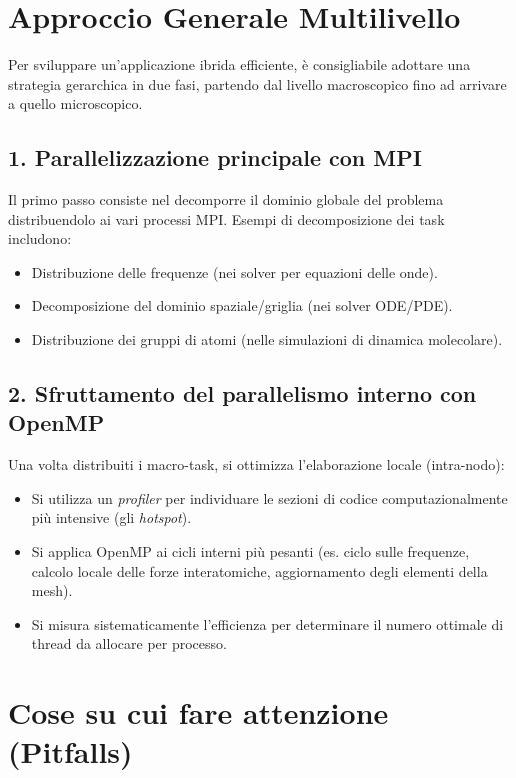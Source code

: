 \section*{Approccio Generale Multilivello}

Per sviluppare un'applicazione ibrida efficiente, è consigliabile adottare una strategia gerarchica in due fasi, partendo dal livello macroscopico fino ad arrivare a quello microscopico.

\subsection*{1. Parallelizzazione principale con MPI}
Il primo passo consiste nel decomporre il dominio globale del problema distribuendolo ai vari processi MPI. Esempi di decomposizione dei task includono:
\begin{itemize}
    \item Distribuzione delle frequenze (nei solver per equazioni delle onde).
    \item Decomposizione del dominio spaziale/griglia (nei solver ODE/PDE).
    \item Distribuzione dei gruppi di atomi (nelle simulazioni di dinamica molecolare).
\end{itemize}

\subsection*{2. Sfruttamento del parallelismo interno con OpenMP}
Una volta distribuiti i macro-task, si ottimizza l'elaborazione locale (intra-nodo):
\begin{itemize}
    \item Si utilizza un \textit{profiler} per individuare le sezioni di codice computazionalmente più intensive (gli \textit{hotspot}).
    \item Si applica OpenMP ai cicli interni più pesanti (es. ciclo sulle frequenze, calcolo locale delle forze interatomiche, aggiornamento degli elementi della mesh).
    \item Si misura sistematicamente l'efficienza per determinare il numero ottimale di thread da allocare per processo.
\end{itemize}


\section*{Cose su cui fare attenzione (Pitfalls)}

